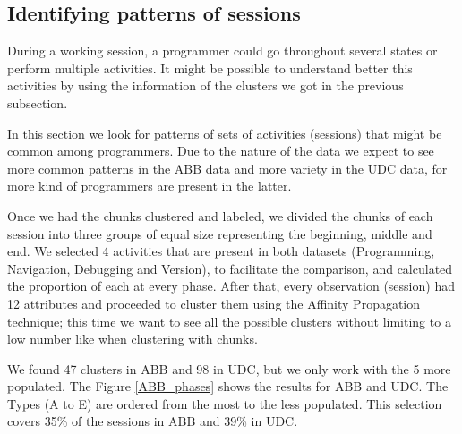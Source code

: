 \subsection{Identifying patterns of sessions}
During a working session, a programmer could go throughout several states or perform multiple activities. It might be possible to understand better this activities by using the information of the clusters we got in the previous subsection. 

In this section we look for patterns of sets of activities (sessions) that might be common among programmers. Due to the nature of the data we expect to see more common patterns in the ABB data and more variety in the UDC data, for more kind of programmers are present in the latter.

Once we had the chunks clustered and labeled, we divided the chunks of each session into three groups of equal size representing the beginning, middle and end. We selected 4 activities that are present in both datasets (Programming, Navigation, Debugging and Version), to facilitate the comparison, and calculated the proportion of each at every phase. After that, every observation (session) had 12 attributes and proceeded to cluster them using the Affinity Propagation technique; this time we want to see all the possible clusters without limiting to a low number like when clustering with chunks. 

We found 47 clusters in ABB and 98 in UDC, but we only work with the 5 more populated. The Figure \ref{ABB_phases} shows the results for ABB and UDC. The Types (A to E) are ordered from the most to the less populated. This selection covers 35\% of the sessions in ABB and 39\% in UDC. 

